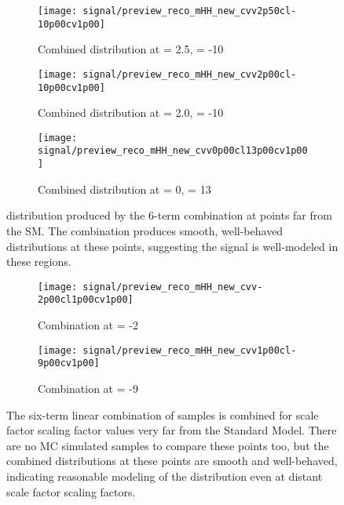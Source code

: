     \begin{figure}[tbh]
        \centering
        \begin{subfigure}{0.32\textwidth}
            \texttt{[image: signal/preview\_reco\_mHH\_new\_cvv2p50cl-10p00cv1p00]}
            \captionsetup{justification=centering} \caption{Combined \mhh distribution at \kvv = 2.5, \kl = -10}
        \end{subfigure}
        \begin{subfigure}{0.32\textwidth}
            \texttt{[image: signal/preview\_reco\_mHH\_new\_cvv2p00cl-10p00cv1p00]}
            \captionsetup{justification=centering} \caption{Combined \mhh distribution at \kvv = 2.0, \kl = -10}
        \end{subfigure}
        \begin{subfigure}{0.32\textwidth}
            \texttt{[image: signal/preview\_reco\_mHH\_new\_cvv0p00cl13p00cv1p00]}
            \captionsetup{justification=centering} \caption{Combined \mhh distribution at \kvv = 0, \kl = 13}
        \end{subfigure}
        \caption{
            \mhh distribution produced by the 6-term combination at points far from the SM.
            The combination produces smooth, well-behaved distributions at these points,
                suggesting the signal is well-modeled in these regions.
        }
        \label{fig:vbf_hh_6term_preview}
    \end{figure}

    \begin{figure}[tbh]
    	\centering
        \begin{subfigure}{0.44\textwidth}
            \texttt{[image: signal/preview\_reco\_mHH\_new\_cvv-2p00cl1p00cv1p00]}
            \captionsetup{justification=centering} \caption{Combination at  \kvv = -2}
        \end{subfigure}
        \begin{subfigure}{0.44\textwidth}
            \texttt{[image: signal/preview\_reco\_mHH\_new\_cvv1p00cl-9p00cv1p00]}
            \captionsetup{justification=centering} \caption{Combination at  \kl = -9}
        \end{subfigure}
        \caption{
            The six-term linear combination of samples is combined for scale factor scaling factor values very far from the Standard Model.
            There are no MC simulated samples to compare these points too, but the combined distributions at these points are smooth and well-behaved,
                indicating reasonable modeling of the distribution even at distant scale factor scaling factors.
        }
        \label{fig:vbf_hh_preview}
    \end{figure}


